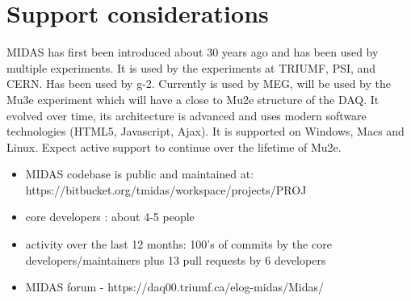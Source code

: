 \section{Support considerations}

MIDAS has first been introduced about 30 years ago and has been used
by multiple experiments. It is used by the experiments at TRIUMF, PSI,
and CERN. Has been used by g-2. Currently is used by MEG, will be used by the Mu3e experiment which will have
a close to Mu2e structure of the DAQ.
It evolved over time, its architecture is advanced and uses modern software
technologies (HTML5, Javascript, Ajax).
It is supported on Windows, Macs and Linux.
Expect active support to continue over the lifetime of Mu2e.

\begin{itemize}
\item 
  MIDAS codebase is public and maintained at: https://bitbucket.org/tmidas/workspace/projects/PROJ
\item
  core developers : about 4-5 people
\item
  activity over the last 12 months: 100's of commits by the core developers/maintainers plus
  13 pull requests by 6 developers
\item 
  MIDAS forum - https://daq00.triumf.ca/elog-midas/Midas/
\end{itemize}




